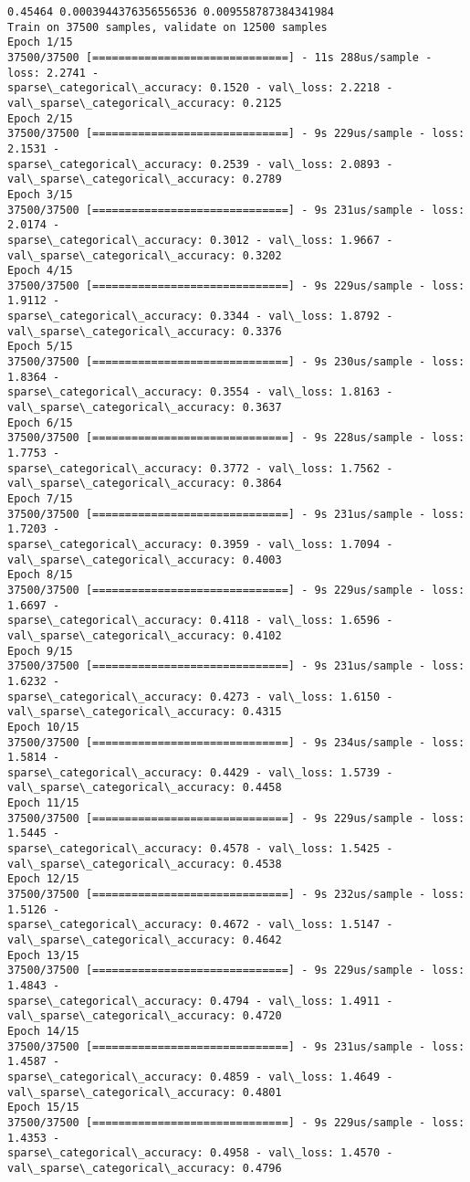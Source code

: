 \documentclass[11pt]{article}
\begin{document}
    \begin{Verbatim}[commandchars=\\\{\}]
0.45464 0.0003944376356556536 0.009558787384341984
Train on 37500 samples, validate on 12500 samples
Epoch 1/15
37500/37500 [==============================] - 11s 288us/sample - loss: 2.2741 -
sparse\_categorical\_accuracy: 0.1520 - val\_loss: 2.2218 -
val\_sparse\_categorical\_accuracy: 0.2125
Epoch 2/15
37500/37500 [==============================] - 9s 229us/sample - loss: 2.1531 -
sparse\_categorical\_accuracy: 0.2539 - val\_loss: 2.0893 -
val\_sparse\_categorical\_accuracy: 0.2789
Epoch 3/15
37500/37500 [==============================] - 9s 231us/sample - loss: 2.0174 -
sparse\_categorical\_accuracy: 0.3012 - val\_loss: 1.9667 -
val\_sparse\_categorical\_accuracy: 0.3202
Epoch 4/15
37500/37500 [==============================] - 9s 229us/sample - loss: 1.9112 -
sparse\_categorical\_accuracy: 0.3344 - val\_loss: 1.8792 -
val\_sparse\_categorical\_accuracy: 0.3376
Epoch 5/15
37500/37500 [==============================] - 9s 230us/sample - loss: 1.8364 -
sparse\_categorical\_accuracy: 0.3554 - val\_loss: 1.8163 -
val\_sparse\_categorical\_accuracy: 0.3637
Epoch 6/15
37500/37500 [==============================] - 9s 228us/sample - loss: 1.7753 -
sparse\_categorical\_accuracy: 0.3772 - val\_loss: 1.7562 -
val\_sparse\_categorical\_accuracy: 0.3864
Epoch 7/15
37500/37500 [==============================] - 9s 231us/sample - loss: 1.7203 -
sparse\_categorical\_accuracy: 0.3959 - val\_loss: 1.7094 -
val\_sparse\_categorical\_accuracy: 0.4003
Epoch 8/15
37500/37500 [==============================] - 9s 229us/sample - loss: 1.6697 -
sparse\_categorical\_accuracy: 0.4118 - val\_loss: 1.6596 -
val\_sparse\_categorical\_accuracy: 0.4102
Epoch 9/15
37500/37500 [==============================] - 9s 231us/sample - loss: 1.6232 -
sparse\_categorical\_accuracy: 0.4273 - val\_loss: 1.6150 -
val\_sparse\_categorical\_accuracy: 0.4315
Epoch 10/15
37500/37500 [==============================] - 9s 234us/sample - loss: 1.5814 -
sparse\_categorical\_accuracy: 0.4429 - val\_loss: 1.5739 -
val\_sparse\_categorical\_accuracy: 0.4458
Epoch 11/15
37500/37500 [==============================] - 9s 229us/sample - loss: 1.5445 -
sparse\_categorical\_accuracy: 0.4578 - val\_loss: 1.5425 -
val\_sparse\_categorical\_accuracy: 0.4538
Epoch 12/15
37500/37500 [==============================] - 9s 232us/sample - loss: 1.5126 -
sparse\_categorical\_accuracy: 0.4672 - val\_loss: 1.5147 -
val\_sparse\_categorical\_accuracy: 0.4642
Epoch 13/15
37500/37500 [==============================] - 9s 229us/sample - loss: 1.4843 -
sparse\_categorical\_accuracy: 0.4794 - val\_loss: 1.4911 -
val\_sparse\_categorical\_accuracy: 0.4720
Epoch 14/15
37500/37500 [==============================] - 9s 231us/sample - loss: 1.4587 -
sparse\_categorical\_accuracy: 0.4859 - val\_loss: 1.4649 -
val\_sparse\_categorical\_accuracy: 0.4801
Epoch 15/15
37500/37500 [==============================] - 9s 229us/sample - loss: 1.4353 -
sparse\_categorical\_accuracy: 0.4958 - val\_loss: 1.4570 -
val\_sparse\_categorical\_accuracy: 0.4796
    \end{Verbatim}
\end{document}
